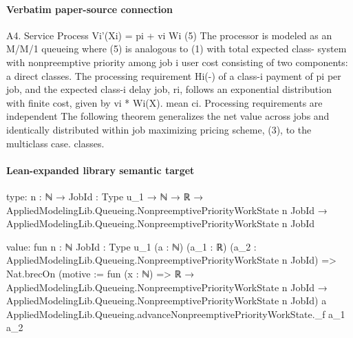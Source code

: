 \documentclass[10pt]{article}
\begin{document}
\paragraph{Verbatim paper-source connection}
\begin{ReviewVerbatim}
A4. Service Process                                                      Vi'(Xi) = pi + vi Wi (5)
The processor is modeled as an M/M/1 queueing                          where (5) is analogous to (1) with total expected class-
system with nonpreemptive priority among job                           i user cost consisting of two components: a direct
classes. The processing requirement Hi(-) of a class-i                 payment of pi per job, and the expected class-i delay
job, ri, follows an exponential distribution with finite cost, given by vi * Wi(X).
mean ci. Processing requirements are independent           The following theorem generalizes the net value
across jobs and identically distributed within job       maximizing pricing scheme, (3), to the multiclass case.
classes.
\end{ReviewVerbatim}



\paragraph{Lean-expanded library semantic target}
\begin{ReviewVerbatim}
type:
{n : ℕ} →
  {JobId : Type u_1} →
    ℕ →
      ℝ →
        AppliedModelingLib.Queueing.NonpreemptivePriorityWorkState n JobId →
          AppliedModelingLib.Queueing.NonpreemptivePriorityWorkState n JobId

value:
fun {n : ℕ} {JobId : Type u_1} (a : ℕ) (a_1 : ℝ)
    (a_2 : AppliedModelingLib.Queueing.NonpreemptivePriorityWorkState n JobId) =>
  Nat.brecOn (motive := fun (x : ℕ) =>
    ℝ →
      AppliedModelingLib.Queueing.NonpreemptivePriorityWorkState n JobId →
        AppliedModelingLib.Queueing.NonpreemptivePriorityWorkState n JobId)
    a AppliedModelingLib.Queueing.advanceNonpreemptivePriorityWorkState._f a_1 a_2
\end{ReviewVerbatim}
\end{document}

